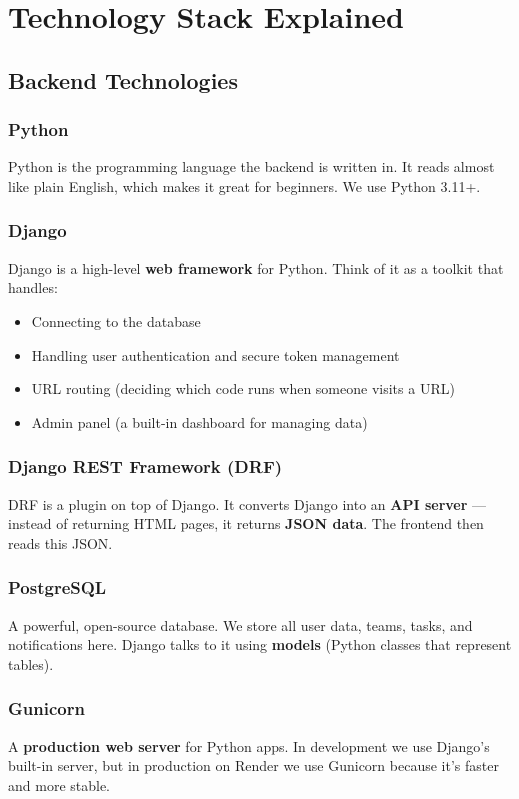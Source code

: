 \documentclass[12pt,a4paper]{article}
\begin{document}
\section{Technology Stack Explained}

\subsection{Backend Technologies}

\subsubsection{Python}
Python is the programming language the backend is written in. It reads almost like plain English, which makes it great for beginners. We use Python 3.11+.

\subsubsection{Django}
Django is a high-level \textbf{web framework} for Python. Think of it as a toolkit that handles:
\begin{itemize}
    \item Connecting to the database
    \item Handling user authentication and secure token management
    \item URL routing (deciding which code runs when someone visits a URL)
    \item Admin panel (a built-in dashboard for managing data)
\end{itemize}

\subsubsection{Django REST Framework (DRF)}
DRF is a plugin on top of Django. It converts Django into an \textbf{API server} — instead of returning HTML pages, it returns \textbf{JSON data}. The frontend then reads this JSON.

\subsubsection{PostgreSQL}
A powerful, open-source database. We store all user data, teams, tasks, and notifications here. Django talks to it using \textbf{models} (Python classes that represent tables).

\subsubsection{Gunicorn}
A \textbf{production web server} for Python apps. In development we use Django's built-in server, but in production on Render we use Gunicorn because it's faster and more stable.
\end{document}
